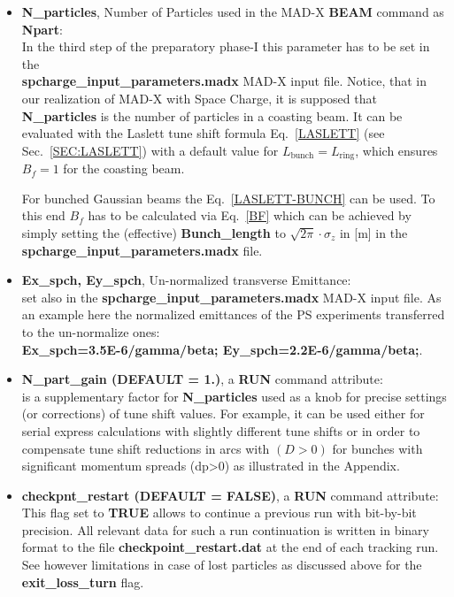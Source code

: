 \begin{itemize}
\item {\bf N\_particles}, Number of Particles used in the MAD-X {\bf
  BEAM} command as {\bf Npart}: \\In the third step of the preparatory
  phase-I this parameter has to be set in the \\{\bf
    spcharge\_input\_parameters.madx} MAD-X input file. Notice, that in
  our realization of MAD-X with Space Charge, it is supposed that {\bf
    N\_particles} is the number of particles in a coasting beam. It
  can be evaluated with the Laslett tune shift formula
  Eq.~\ref{LASLETT} (see Sec.~\ref{SEC:LASLETT}) with a default value
  for $L_{\textrm{bunch}} = L_{\textrm{ring}}$, which ensures $B_f=1$
  for the coasting beam.

  For bunched Gaussian beams the Eq.~\ref{LASLETT-BUNCH} can be
  used. To this end $B_f$ has to be calculated via Eq.~\ref{BF} which
  can be achieved by simply setting the (effective) {\bf
    Bunch\_length} to $\sqrt{2\pi} \cdot \sigma_z$ in [m] in the {\bf
    spcharge\_input\_parameters.madx} file.
\item {\bf Ex\_spch, Ey\_spch}, Un-normalized transverse Emittance: \\set
  also in the {\bf spcharge\_input\_parameters.madx} MAD-X input
  file. As an example here the normalized emittances of the PS
  experiments transferred to the un-normalize ones: \hfill\\{\bf
    Ex\_spch=3.5E-6/gamma/beta;
    Ey\_spch=2.2E-6/gamma/beta;}.
\item {\bf N\_part\_gain (DEFAULT = 1.)}, a {\bf RUN} command
  attribute:\\ is a supplementary factor for {\bf N\_particles} used
  as a knob for precise settings (or corrections) of tune shift
  values. For example, it can be used either for serial express
  calculations with slightly different tune shifts or in order to
  compensate tune shift reductions in arcs with $(D>0)$ for bunches
  with significant momentum spreads (dp>0) as illustrated in the
  Appendix.
\item {\bf checkpnt\_restart (DEFAULT = FALSE)}, a {\bf RUN} command
  attribute:\\ This flag set to {\bf TRUE} allows to continue a
  previous run with bit-by-bit precision. All relevant data for such a
  run continuation is written in binary format to the file {\bf
    checkpoint\_restart.dat} at the end of each tracking run. See
  however limitations in case of lost particles as discussed above for
  the {\bf exit\_loss\_turn} flag.
\end{itemize}

